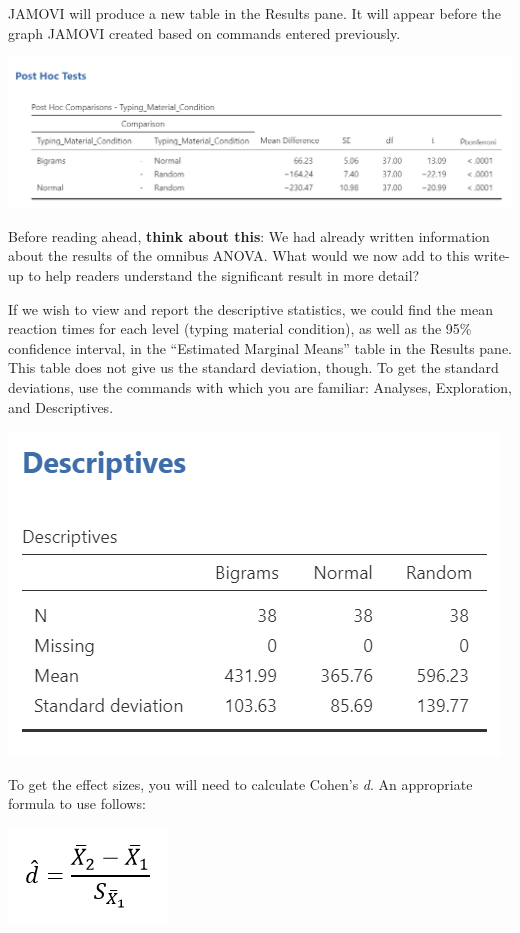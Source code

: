 \documentclass[
]{book}
\begin{document}
JAMOVI will produce a new table in the Results pane. It will appear before the graph JAMOVI created based on commands entered previously.

\includegraphics{img/RM_ANOVA_PostHocResults.png}

Before reading ahead, \textbf{think about this}: We had already written information about the results of the omnibus ANOVA. What would we now add to this write-up to help readers understand the significant result in more detail?

If we wish to view and report the descriptive statistics, we could find the mean reaction times for each level (typing material condition), as well as the 95\% confidence interval, in the ``Estimated Marginal Means'' table in the Results pane. This table does not give us the standard deviation, though. To get the standard deviations, use the commands with which you are familiar: {Analyses}, {Exploration}, and {Descriptives}.

\includegraphics{img/RM_ANOVA_DescStats.png}

To get the effect sizes, you will need to calculate Cohen's \emph{d}. An appropriate formula to use follows:

\includegraphics{img/RM_ANOVA_Cohensd.png}
\end{document}
